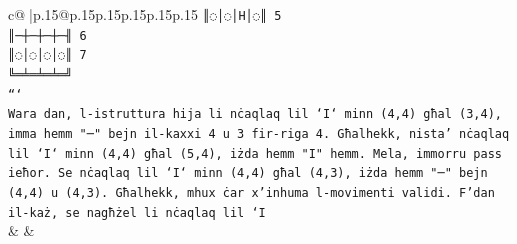 \documentclass{article}
\begin{document}
{\begin{supertabular}{c@{$\;$}|p{.15\linewidth}@{}p{.15\linewidth}p{.15\linewidth}p{.15\linewidth}p{.15\linewidth}p{.15\linewidth}}
{{{\texttt{║◌│◌│H│◌║ 5} \\
\texttt{║─┼─┼─┼─╢ 6} \\
\texttt{║◌│◌│◌│◌║ 7} \\
\texttt{╚═╧═╧═╧═╝} \\
\texttt{```} \\
\texttt{Wara dan, l{-}istruttura hija li nċaqlaq lil `I` minn (4,4) għal (3,4), imma hemm "─" bejn il{-}kaxxi 4 u 3 fir{-}riga 4. Għalhekk, nista' nċaqlaq lil `I` minn (4,4) għal (5,4), iżda hemm "I" hemm. Mela, immorru pass ieħor. Se nċaqlaq lil `I` minn (4,4) għal (4,3), iżda hemm "─" bejn (4,4) u (4,3). Għalhekk, mhux ċar x'inhuma l{-}movimenti validi. F'dan il{-}każ, se nagħżel li nċaqlaq lil `I} \\
            }
        }
    }
    & & \\ \\


\end{supertabular}}
\end{document}
